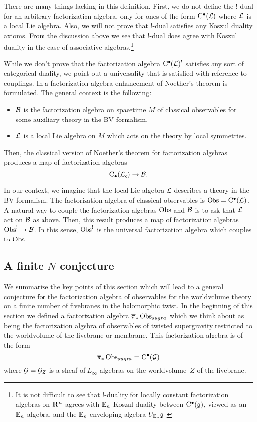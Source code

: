 There are many things lacking in this definition. 
First, we do not define the $!$-dual for an arbitrary factorization algebra, only for ones of the form ${\rm C}^\bullet(\mathcal L)$ where $\mathcal L$ is a local Lie algebra. 
Also, we will not prove that $!$-dual satisfies any Koszul duality axioms. 
From the discussion above we see that $!$-dual does agree with Koszul duality in the case of associative algebras.\footnote{It is not difficult to see that $!$-duality for locally constant factorization algebras on $\mathbf{R}^n$ agrees with $\mathbb E_n$ Koszul duality between ${\rm C}^\bullet(\mathfrak g)$, viewed as an $\mathbb E_n$ algebra, and the $\mathbb E_n$ enveloping algebra $U_{\mathbb E_n} \mathfrak g$ \cite{Knudsen, Lurie,...}}

\parsec[s:noether]

While we don't prove that the factorization algebra ${\rm C}^\bullet(\mathcal L)^!$ satisfies any sort of categorical duality, we point out a universality that is satisfied with reference to couplings.
In \cite[Part 3]{CG2} a factorization algebra enhancement of Noether's theorem is formulated. 
The general context is the following: 
\begin{itemize}
\item $\mathcal B$ is the factorization algebra on spacetime $M$ of classical observables for some auxiliary theory in the BV formalism.
\item $\mathcal L$ is a local Lie algebra on $M$ which acts on the theory by local symmetries. 
\end{itemize}
Then, the classical version of Noether's theorem for factorization algebras produces a map of factorization algebras 
\[
{\rm C}_\bullet(\mathcal L_c) \to \mathcal B .
\]

In our context, we imagine that the local Lie algebra $\mathcal L$ describes a theory in the BV formalism.
The factorization algebra of classical observables is $\operatorname{Obs} = {\rm C}^\bullet(\mathcal L)$. 
A natural way to couple the factorization algebras $\operatorname{Obs}$ and $\mathcal B$ is to ask that $\mathcal L$ act on $\mathcal B$ as above.
Then, this result produces a map of factorization algebras $\operatorname{Obs}^! \to \mathcal B$.
In this sense, $\operatorname{Obs}^!$ is the universal factorization algebra which couples to $\operatorname{Obs}$.

\subsection{A finite $N$ conjecture}
\label{sec:factsummary}

We summarize the key points of this section which will lead to a general conjecture for the factorization algebra of observables for the worldvolume theory on a finite number of fivebranes in the holomorphic twist.
In the beginning of this section we defined a factorization algebra $\overline{\pi}_*\operatorname{Obs}_{sugra}$ which we think about as being the factorization algebra of observables of twisted supergravity restricted to the worldvolume of the fivebrane or membrane.
This factorization algebra is of the form 
\[
\overline{\pi}_*\operatorname{Obs}_{sugra} = {\rm C}^\bullet(\mathcal G)
\]
where $\mathcal G = \mathcal G_Z$ is a sheaf of $L_\infty$ algebras on the worldvolume~$Z$ of the fivebrane.

